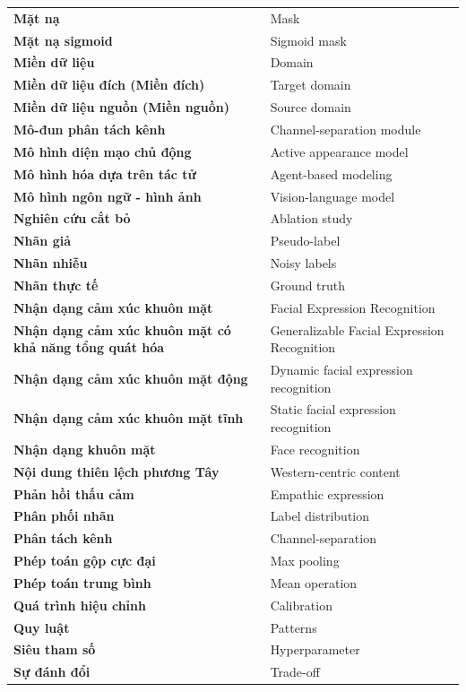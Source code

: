 \begin{longtable}{p{6.5cm} p{8.5cm}}
\textbf{Mặt nạ} & Mask \\
\textbf{Mặt nạ sigmoid} & Sigmoid mask \\
\textbf{Miền dữ liệu} & Domain \\
\textbf{Miền dữ liệu đích (Miền đích)} & Target domain \\
\textbf{Miền dữ liệu nguồn (Miền nguồn)} & Source domain \\
\textbf{Mô-đun phân tách kênh} & Channel-separation module \\
\textbf{Mô hình diện mạo chủ động} & Active appearance model \\
\textbf{Mô hình hóa dựa trên tác tử} & Agent-based modeling \\
\textbf{Mô hình ngôn ngữ - hình ảnh} & Vision-language model \\
\textbf{Nghiên cứu cắt bỏ} & Ablation study \\
\textbf{Nhãn giả} & Pseudo-label \\
\textbf{Nhãn nhiễu} & Noisy labels \\
\textbf{Nhãn thực tế} & Ground truth \\
\textbf{Nhận dạng cảm xúc khuôn mặt} & Facial Expression Recognition \\
\textbf{Nhận dạng cảm xúc khuôn mặt có khả năng tổng quát hóa} & Generalizable Facial Expression Recognition \\
\textbf{Nhận dạng cảm xúc khuôn mặt động} & Dynamic facial expression recognition \\
\textbf{Nhận dạng cảm xúc khuôn mặt tĩnh} & Static facial expression recognition \\
\textbf{Nhận dạng khuôn mặt} & Face recognition \\
\textbf{Nội dung thiên lệch phương Tây} & Western-centric content \\
\textbf{Phản hồi thấu cảm} & Empathic expression \\
\textbf{Phân phối nhãn} & Label distribution \\
\textbf{Phân tách kênh} & Channel-separation \\
\textbf{Phép toán gộp cực đại} & Max pooling \\
\textbf{Phép toán trung bình} & Mean operation \\
\textbf{Quá trình hiệu chỉnh} & Calibration \\
\textbf{Quy luật} & Patterns \\
\textbf{Siêu tham số} & Hyperparameter \\
\textbf{Sự đánh đổi} & Trade-off \\

\end{longtable}
